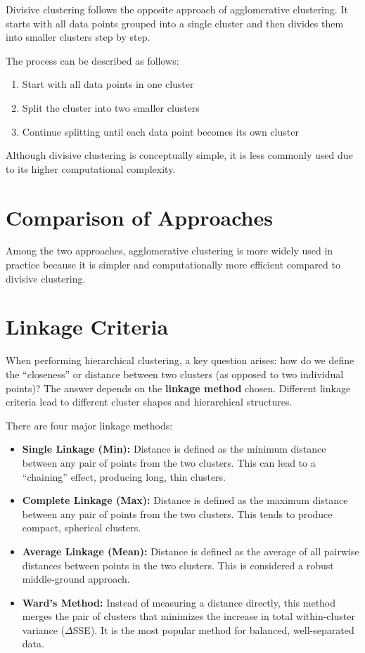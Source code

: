 \documentclass{article}
\begin{document}
Divisive clustering follows the opposite approach of agglomerative clustering. It starts with all data points grouped into a single cluster and then divides them into smaller clusters step by step.

The process can be described as follows:
\begin{enumerate}
    \item Start with all data points in one cluster
    \item Split the cluster into two smaller clusters
    \item Continue splitting until each data point becomes its own cluster
\end{enumerate}

Although divisive clustering is conceptually simple, it is less commonly used due to its higher computational complexity.

\section{Comparison of Approaches}

Among the two approaches, agglomerative clustering is more widely used in practice because it is simpler and computationally more efficient compared to divisive clustering.

\section{Linkage Criteria}

When performing hierarchical clustering, a key question arises: how do we define the ``closeness'' or distance between two clusters (as opposed to two individual points)? The answer depends on the \textbf{linkage method} chosen. Different linkage criteria lead to different cluster shapes and hierarchical structures.

There are four major linkage methods:

\begin{itemize}
    \item \textbf{Single Linkage (Min):} Distance is defined as the minimum distance between any pair of points from the two clusters. This can lead to a ``chaining'' effect, producing long, thin clusters.
    \item \textbf{Complete Linkage (Max):} Distance is defined as the maximum distance between any pair of points from the two clusters. This tends to produce compact, spherical clusters.
    \item \textbf{Average Linkage (Mean):} Distance is defined as the average of all pairwise distances between points in the two clusters. This is considered a robust middle-ground approach.
    \item \textbf{Ward's Method:} Instead of measuring a distance directly, this method merges the pair of clusters that minimizes the increase in total within-cluster variance ($\Delta$SSE). It is the most popular method for balanced, well-separated data.
\end{itemize}
\end{document}
